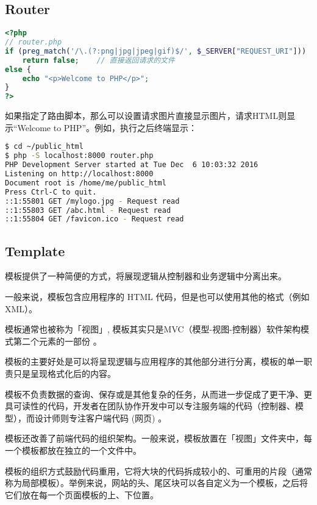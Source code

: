 \subsection{Router}







\begin{lstlisting}[language=PHP]
<?php
// router.php
if (preg_match('/\.(?:png|jpg|jpeg|gif)$/', $_SERVER["REQUEST_URI"]))
    return false;    // 直接返回请求的文件
else { 
    echo "<p>Welcome to PHP</p>";
}
?>
\end{lstlisting}


如果指定了路由脚本，那么可以设置请求图片直接显示图片，请求HTML则显示“Welcome to PHP”。例如，执行之后终端显示：


\begin{lstlisting}[language=bash]
$ cd ~/public_html
$ php -S localhost:8000 router.php
PHP Development Server started at Tue Dec  6 10:03:32 2016
Listening on http://localhost:8000
Document root is /home/me/public_html
Press Ctrl-C to quit.
::1:55801 GET /mylogo.jpg - Request read
::1:55803 GET /abc.html - Request read
::1:55804 GET /favicon.ico - Request read
\end{lstlisting}

\subsection{Template}

模板提供了一种简便的方式，将展现逻辑从控制器和业务逻辑中分离出来。


一般来说，模板包含应用程序的 HTML 代码，但是也可以使用其他的格式（例如 XML）。

模板通常也被称为「视图」, 模板其实只是MVC（模型-视图-控制器）软件架构模式第二个元素的一部份 。

模板的主要好处是可以将呈现逻辑与应用程序的其他部分进行分离，模板的单一职责只是呈现格式化后的内容。

模板不负责数据的查询、保存或是其他复杂的任务，从而进一步促成了更干净、更具可读性的代码，开发者在团队协作开发中可以专注服务端的代码（控制器、模型），而设计师则专注客户端代码 (网页) 。

模板还改善了前端代码的组织架构。一般来说，模板放置在「视图」文件夹中，每一个模板都放在独立的一个文件中。

模板的组织方式鼓励代码重用，它将大块的代码拆成较小的、可重用的片段（通常称为局部模板）。举例来说，网站的头、尾区块可以各自定义为一个模板，之后将它们放在每一个页面模板的上、下位置。

